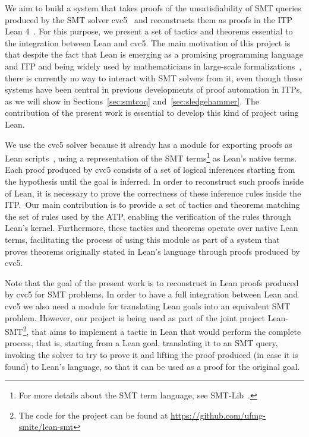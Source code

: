 We aim to build a system that takes proofs of the unsatisfiability of
SMT queries produced by the SMT solver cvc5~\cite{cvc5} and reconstructs them as proofs in the ITP Lean 4~\cite{lean}.
%
For this purpose, we present a set of tactics and theorems essential
to the integration between Lean and cvc5.
%
The main motivation of this project is that despite the fact that Lean is
emerging as a promising programming language and ITP and being
widely used by mathematicians in large-scale
formalizations~\cite{mathlib, scholze}, there is currently no way to
interact with SMT solvers from it, even though these systems have been
central in previous developments of proof automation in ITPs, as we will show in Sections~\ref{sec:smtcoq}
and~\ref{sec:sledgehammer}. The contribution of the present work
is essential to develop this kind of project using Lean.


We use the cvc5 solver because it already has a module for exporting proofs as
Lean scripts~\cite{Barbosa2022}, using a representation of the SMT terms\footnote{For more details
about the SMT term language, see SMT-Lib~\cite{smtlib}.} as Lean's native terms.
Each proof produced by cvc5 consists of a set of logical inferences starting from the
hypothesis until the goal is inferred. In order to reconstruct such proofs inside of
Lean, it is necessary to prove the correctness of these inference rules inside the
ITP.\ Our main contribution is to provide a set of tactics and theorems matching the set
of rules used by the ATP, enabling the verification of the rules through Lean's kernel.
Furthermore, these tactics and theorems operate over native Lean terms, facilitating the process of using this module as part of a system that proves theorems originally stated
in Lean's language through proofs produced by cvc5.

Note that the goal of the present work is to reconstruct in Lean proofs produced by
cvc5 for SMT problems. In order to have a full integration between Lean and cvc5 we also
need a module for translating Lean goals into an equivalent SMT problem.
However, our project is being used
as part of the joint project Lean-SMT\footnote{The code for the project can be found at \url{https://github.com/ufmg-smite/lean-smt}}, that aims to implement a tactic in Lean
that would perform the complete process, that is, starting from a Lean goal, translating it to an SMT query, invoking the solver to try to prove it and lifting the proof produced (in case it is found) to Lean's language, so that it can be used as a proof for the original goal.
